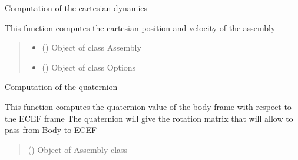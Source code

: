 \documentclass[letterpaper,10pt,english]{sphinxmanual}
\begin{document}
\begin{fulllineitems}
\label{\detokenize{modules:dynamics.compute_cartesian}}
\pysigstartsignatures
{}
\pysigstopsignatures
\sphinxAtStartPar
Computation of the cartesian dynamics

\sphinxAtStartPar
This function computes the cartesian position and velocity of the assembly
\begin{quote}\begin{description}
\begin{itemize}
\item {} 
\sphinxAtStartPar
{} ({\hyperref[\detokenize{modules:assembly.Assembly}]{}}) \textendash{} Object of class Assembly

\item {} 
\sphinxAtStartPar
{} ({\hyperref[\detokenize{modules:configuration.Options}]{}}) \textendash{} Object of class Options

\end{itemize}

\end{description}\end{quote}

\end{fulllineitems}


\begin{fulllineitems}
\label{\detokenize{modules:dynamics.compute_quaternion}}
\pysigstartsignatures
{}
\pysigstopsignatures
\sphinxAtStartPar
Computation of the quaternion

\sphinxAtStartPar
This function computes the quaternion value of the body frame with respect to the ECEF frame
The quaternion will give the rotation matrix that will allow to pass from Body to ECEF
\begin{quote}\begin{description}
\sphinxAtStartPar
{} ({\hyperref[\detokenize{modules:assembly.Assembly}]{}}) \textendash{} Object of Assembly class

\end{description}\end{quote}

\end{fulllineitems}
\end{document}
